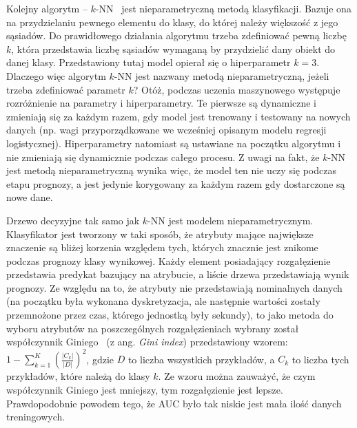 \documentclass[a4paper,twoside,12pt]{book}
\newcommand{\obcy}[1]{\emph{#1}}
\newcommand{\ang}[1]{{\selectlanguage{british}\obcy{#1}}}
\begin{document}
Kolejny algorytm -- $k$-NN~\cite{knn} jest nieparametryczną metodą klasyfikacji. Bazuje ona na przydzielaniu pewnego elementu do klasy, do której należy większość z jego sąsiadów. Do prawidłowego działania algorytmu trzeba zdefiniować pewną liczbę $k$, która przedstawia liczbę sąsiadów wymaganą by przydzielić dany obiekt do danej klasy. Przedstawiony tutaj model opierał się o hiperparametr $k=3$. Dlaczego więc algorytm $k$-NN jest nazwany metodą nieparametryczną, jeżeli trzeba zdefiniować parametr $ k $? Otóż, podczas uczenia maszynowego występuje rozróżnienie na parametry i hiperparametry. Te pierwsze są dynamiczne i zmieniają się za każdym razem, gdy model jest trenowany i testowany na nowych danych (np. wagi przyporządkowane we wcześniej opisanym modelu regresji logistycznej). Hiperparametry natomiast są ustawiane na początku algorytmu i nie zmieniają się dynamicznie podczas całego procesu. Z uwagi na fakt, że $k$-NN jest metodą nieparametryczną wynika więc, że model ten nie uczy się podczas etapu prognozy, a jest jedynie korygowany za każdym razem gdy dostarczone są nowe dane. 

Drzewo decyzyjne tak samo jak $k$-NN jest modelem nieparametrycznym. Klasyfikator jest tworzony w taki sposób, że atrybuty mające największe znaczenie są bliżej korzenia względem tych, których znacznie jest znikome podczas prognozy klasy wynikowej. Każdy element posiadający rozgałęzienie przedstawia predykat bazujący na atrybucie, a liście drzewa przedstawiają wynik prognozy. Ze względu na to, że atrybuty nie przedstawiają nominalnych danych (na początku była wykonana dyskretyzacja, ale następnie wartości zostały przemnożone przez czas, którego jednostką były sekundy), to jako metoda do wyboru atrybutów na poszczególnych rozgałęzieniach wybrany został współczynnik Giniego~\cite{gini} (z ang. \ang{Gini index}) przedstawiony wzorem:
$
1-\sum_{k=1}^{K}\left ( \frac{\left | C_{k} \right |}{\left | D \right |} \right )^{2}
$, gdzie $ D $ to liczba wszystkich przykładów, a $ C_{k} $ to liczba tych przykładów, które należą do klasy $ k $. Ze wzoru można zauważyć, że czym współczynnik Giniego jest mniejszy, tym rozgałęzienie jest lepsze. Prawdopodobnie powodem tego, że AUC było tak niskie jest mała ilość danych treningowych.
\end{document}
